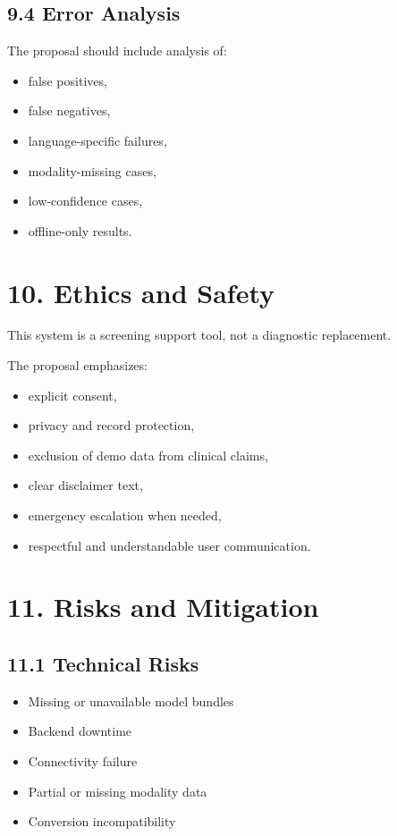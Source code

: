 \documentclass[11pt]{article}
\begin{document}
\subsection{9.4 Error Analysis}
The proposal should include analysis of:
\begin{itemize}[leftmargin=*]
  \item false positives,
  \item false negatives,
  \item language-specific failures,
  \item modality-missing cases,
  \item low-confidence cases,
  \item offline-only results.
\end{itemize}

\section{10. Ethics and Safety}
This system is a screening support tool, not a diagnostic replacement.

The proposal emphasizes:
\begin{itemize}[leftmargin=*]
  \item explicit consent,
  \item privacy and record protection,
  \item exclusion of demo data from clinical claims,
  \item clear disclaimer text,
  \item emergency escalation when needed,
  \item respectful and understandable user communication.
\end{itemize}

\section{11. Risks and Mitigation}
\subsection{11.1 Technical Risks}
\begin{itemize}[leftmargin=*]
  \item Missing or unavailable model bundles
  \item Backend downtime
  \item Connectivity failure
  \item Partial or missing modality data
  \item Conversion incompatibility
\end{itemize}
\end{document}
